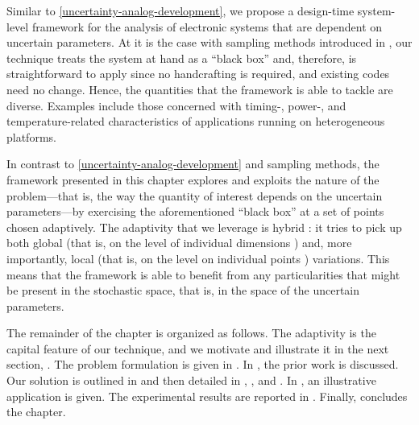 Similar to \cref{uncertainty-analog-development}, we propose a design-time
system-level framework for the analysis of electronic systems that are dependent
on uncertain parameters. At it is the case with sampling methods introduced in
, our technique treats the system at hand as a ``black box'' and,
therefore, is straightforward to apply since no handcrafting is required, and
existing codes need no change. Hence, the quantities that the framework is able
to tackle are diverse. Examples include those concerned with timing-, power-,
and temperature-related characteristics of applications running on heterogeneous
platforms.

In contrast to \cref{uncertainty-analog-development} and sampling methods, the
framework presented in this chapter explores and exploits the nature of the
problem---that is, the way the quantity of interest depends on the uncertain
parameters---by exercising the aforementioned ``black box'' at a set of points
chosen adaptively. The adaptivity that we leverage is hybrid \cite{jakeman2012}:
it tries to pick up both global (that is, on the level of individual dimensions
\cite{klimke2006}) and, more importantly, local (that is, on the level on
individual points \cite{ma2009}) variations. This means that the framework is
able to benefit from any particularities that might be present in the stochastic
space, that is, in the space of the uncertain parameters.

The remainder of the chapter is organized as follows. The adaptivity is the
capital feature of our technique, and we motivate and illustrate it in the next
section, . The problem formulation is given in
. In , the prior work is discussed. Our
solution is outlined in  and then detailed in
, , and
. In , an illustrative
application is given. The experimental results are reported in
. Finally,  concludes the chapter.

